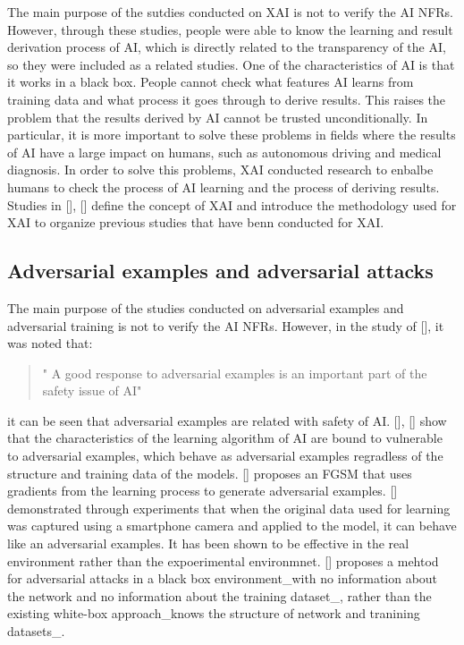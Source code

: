 \documentclass[journal,article,submit,moreauthors,pdftex]{Definitions/mdpi}
\begin{document}
The main purpose of the sutdies conducted on XAI is not to verify the AI NFRs.
However, through these studies, people were able to know the learning and result derivation process of AI, which is directly related to the transparency of the AI, so they were included as a related studies.
One of the characteristics of AI is that it works in a black box. People cannot check what features AI learns from training data and what process it goes through to derive results.
This raises the problem that the results derived by AI cannot be trusted unconditionally.
In particular, it is more important to solve these problems in fields where the results of AI have a large impact on humans, such as autonomous driving and medical diagnosis.
In order to solve this problems, XAI conducted research to enbalbe humans to check the process of AI learning and the process of deriving results.
Studies in [], [] define the concept of XAI and introduce the methodology used for XAI to organize previous studies that have benn conducted for XAI.

\subsection{Adversarial examples and adversarial attacks}

The main purpose of the studies conducted on adversarial examples and adversarial training is not to verify the AI NFRs.
However, in the study of [], it was noted that:
\begin{quote}
   " A good response to adversarial examples is an important part of the safety issue of AI"
\end{quote}
it can be seen that adversarial examples are related with safety of AI.
[], [] show that the characteristics of the learning algorithm of AI are bound to vulnerable to adversarial examples, which behave as adversarial examples regradless of the structure and training data of the models.
[] proposes an FGSM that uses gradients from the learning process to generate adversarial examples.
[] demonstrated through experiments that when the original data used for learning was captured using a smartphone camera and applied to the model, it can behave like an adversarial examples. It has been shown to be effective in the real environment rather than the expoerimental environmnet.
[] proposes a mehtod for adversarial attacks in a black box environment\_with no information about the network and no information about the training dataset\_, rather than the existing white-box approach\_knows the structure of network and tranining datasets\_. \\
\end{document}
